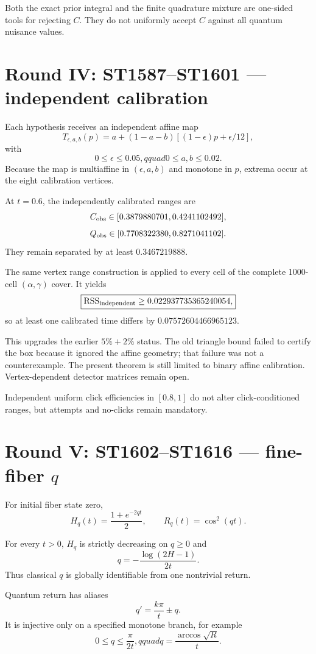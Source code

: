 \documentclass[11pt,a4paper]{article}
\begin{document}
Both the exact prior integral and the finite quadrature mixture are one-sided
tools for rejecting $C$.  They do not uniformly accept $C$ against all
quantum nuisance values.

\section{Round IV: ST1587--ST1601 --- independent calibration}

Each hypothesis receives an independent affine map
\[
T_{\epsilon,a,b}(p)
=a+(1-a-b)\left[(1-\epsilon)p+\epsilon/12\right],
\]
with
\[
0\le\epsilon\le0.05,qquad0\le a,b\le0.02.
\]
Because the map is multiaffine in $(\epsilon,a,b)$ and monotone in $p$, extrema
occur at the eight calibration vertices.

At $t=0.6$, the independently calibrated ranges are
\[
C_{\rm obs}\in[0.3879880701,0.4241102492],
\]
\[
Q_{\rm obs}\in[0.7708322380,0.8271041102].
\]
They remain separated by at least $0.3467219888$.

The same vertex range construction is applied to every cell of the complete
1000-cell $(\alpha,\gamma)$ cover.  It yields
\[
\boxed{\mathrm{RSS}_{\rm independent}\ge0.022937735365240054,}
\]
so at least one calibrated time differs by
$0.07572604466965123$.

This upgrades the earlier $5\%+2\%$ status.  The old triangle bound failed to
certify the box because it ignored the affine geometry; that failure was not a
counterexample.  The present theorem is still limited to binary affine
calibration.  Vertex-dependent detector matrices remain open.

Independent uniform click efficiencies in $[0.8,1]$ do not alter
click-conditioned ranges, but attempts and no-clicks remain mandatory.

\section{Round V: ST1602--ST1616 --- fine-fiber $q$}

For initial fiber state zero,
\[
H_q(t)=\frac{1+e^{-2qt}}2,
\qquad
R_q(t)=\cos^2(qt).
\]

For every $t>0$, $H_q$ is strictly decreasing on $q\ge0$ and
\[
q=-\frac{\log(2H-1)}{2t}.
\]
Thus classical $q$ is globally identifiable from one nontrivial return.

Quantum return has aliases
\[
q'=\frac{k\pi}{t}\pm q.
\]
It is injective only on a specified monotone branch, for example
\[
0\le q\le\frac{\pi}{2t},qquad
q=\frac{\arccos\sqrt R}{t}.
\]
\end{document}
